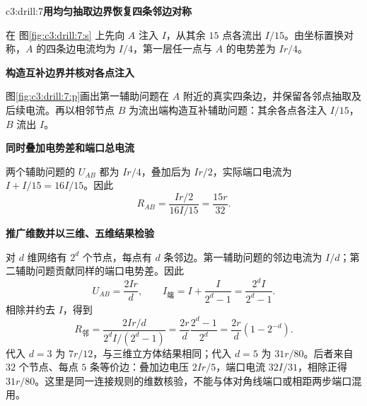 \begin{drillsolution}{c3:drill:7}\textbf{用均匀抽取边界恢复四条邻边对称}\par\nobreak
在 图\ref{fig:c3:drill:7:s} 上先向 $A$ 注入 $I$，从其余 $15$ 点各流出 $I/15$。由坐标置换对称，$A$ 的四条边电流均为 $I/4$，第一层任一点与 $A$ 的电势差为 $Ir/4$。



\par\medskip{}\noindent\textbf{构造互补边界并核对各点注入}\par\nobreak
图\ref{fig:c3:drill:7:p}画出第一辅助问题在 $A$ 附近的真实四条边，并保留各邻点抽取及后续电流。再以相邻节点 $B$ 为流出端构造互补辅助问题：其余各点各注入 $I/15$，$B$ 流出 $I$。

\par\medskip{}\noindent\textbf{同时叠加电势差和端口总电流}\par\nobreak
两个辅助问题的 $U_{AB}$ 都为 $Ir/4$，叠加后为 $Ir/2$，实际端口电流为 $I+I/15=16I/15$。因此
\[
 R_{AB}=\frac{Ir/2}{16I/15}=\frac{15r}{32}.
\]


\par\medskip{}\noindent\textbf{推广维数并以三维、五维结果检验}\par\nobreak
对 $d$ 维网络有 $2^d$ 个节点，每点有 $d$ 条邻边。第一辅助问题的邻边电流为 $I/d$；第二辅助问题贡献同样的端口电势差。因此
\[
 U_{AB}=\frac{2Ir}{d},\qquad
 I_{\text{端}}=I+\frac{I}{2^d-1}=\frac{2^dI}{2^d-1}.
\]
相除并约去 $I$，得到
\[
 R_{\text{邻}}=\frac{2Ir/d}{2^dI/(2^d-1)}
 =\frac{2r}{d}\frac{2^d-1}{2^d}
 =\frac{2r}{d}(1-2^{-d}).
\]
代入 $d=3$ 为 $7r/12$，与三维立方体结果相同；代入 $d=5$ 为 $31r/80$。后者来自 $32$ 个节点、每点 $5$ 条等价边：叠加边电压 $2Ir/5$，端口电流 $32I/31$，相除正得 $31r/80$。这里是同一连接规则的维数核验，不能与体对角线端口或相距两步端口混用。\end{drillsolution}

